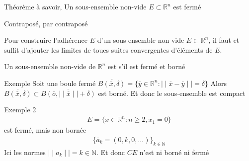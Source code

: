\begin{parag}{Théorème à savoir, Un sous-ensemble non-vide $E \subset \mathbb{R}^n $ est fermé}
\begin{subparag}{Contraposé, par contraposé}
\end{subparag}
\begin{framedremark}
    Pour construire l'adhérence $E$ d'un sous-ensemble non-vide $E \subset \mathbb{R}^n $, il faut et suffit d'ajouter les limites de toues suites convergentes d'éléments de $E$.
\end{framedremark}
    \begin{definition}
        Un sous-ensemble non-vide de $ \mathbb{R}^n $ est  s'il est fermé et borné
    \end{definition}
\begin{subparag}{Exemple}
    Soit une boule fermé $ \overline{B( \overline{x}, \delta)} = \{ \overline{y} \in \mathbb{R}^n : \mid \mid \overline{x} - \overline{y} \mid \mid = \delta\}$ Alors $ \overline{B( \overline{x}, \delta)} \subset \overline{B( \overline{o}, \mid \mid \overline{x} \mid \mid+ \delta)}$ est borné. Et donc le sous-ensemble est compact
\end{subparag}
\begin{subparag}{Exemple 2}
    \begin{align*}
        E = \{ \overline{x} \in \mathbb{R}^n : n \geq 2, x_1 = 0\}
    \end{align*}
    est fermé, mais non bornée
    \begin{align*}
        \{ \overline{a}_k = (0, k, 0, \dots)\}_{k \in \mathbb{N}}
    \end{align*}
    Ici les normes $ \mid \mid a_k \mid \mid = k \in \mathbb{N}$. Et donc $CE$ n'est ni borné ni fermé
    
\end{subparag}
\end{parag}
